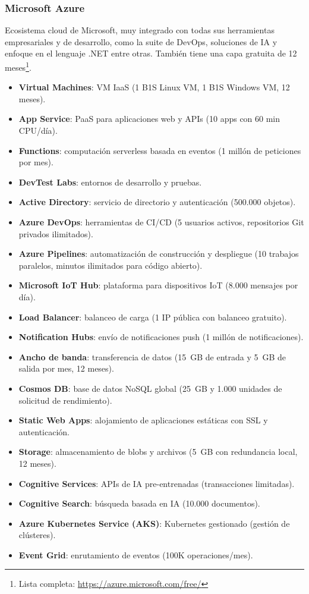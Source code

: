\subsubsection*{Microsoft Azure}

Ecosistema cloud de Microsoft, muy integrado con todas sus herramientas empresariales y de desarrollo, como la suite de DevOps, soluciones de IA y enfoque en el lenguaje .NET entre otras. También tiene una capa gratuita de 12 meses\footnote{Lista completa: \url{https://azure.microsoft.com/free/}}.

\begin{itemize}
	\item \textbf{Virtual Machines}: VM IaaS (1 B1S Linux VM, 1 B1S Windows VM, 12 meses).
	\item \textbf{App Service}: PaaS para aplicaciones web y APIs (10 apps con 60 min CPU/día).
	\item \textbf{Functions}: computación serverless basada en eventos (1 millón de peticiones por mes).
	\item \textbf{DevTest Labs}: entornos de desarrollo y pruebas.
	\item \textbf{Active Directory}: servicio de directorio y autenticación (500.000 objetos).
	\item \textbf{Azure DevOps}: herramientas de CI/CD (5 usuarios activos, repositorios Git privados ilimitados).
	\item \textbf{Azure Pipelines}: automatización de construcción y despliegue (10 trabajos paralelos, minutos ilimitados para código abierto).
	\item \textbf{Microsoft IoT Hub}: plataforma para dispositivos IoT (8.000 mensajes por día).
	\item \textbf{Load Balancer}: balanceo de carga (1 IP pública con balanceo gratuito).
	\item \textbf{Notification Hubs}: envío de notificaciones push (1 millón de notificaciones).
	\item \textbf{Ancho de banda}: transferencia de datos (15~GB de entrada y 5~GB de salida por mes, 12 meses).
	\item \textbf{Cosmos DB}: base de datos NoSQL global (25~GB y 1.000 unidades de solicitud de rendimiento).
	\item \textbf{Static Web Apps}: alojamiento de aplicaciones estáticas con SSL y autenticación.
	\item \textbf{Storage}: almacenamiento de blobs y archivos (5~GB con redundancia local, 12 meses).
	\item \textbf{Cognitive Services}: APIs de IA pre-entrenadas (transacciones limitadas).
	\item \textbf{Cognitive Search}: búsqueda basada en IA (10.000 documentos).
	\item \textbf{Azure Kubernetes Service (AKS)}: Kubernetes gestionado (gestión de clústeres).
	\item \textbf{Event Grid}: enrutamiento de eventos (100K operaciones/mes).
\end{itemize}

